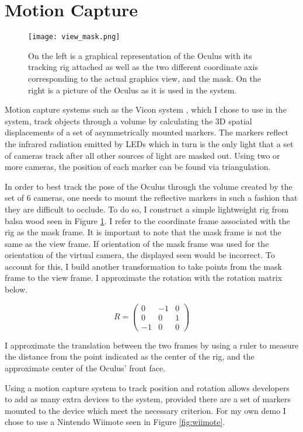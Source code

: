 \section{Motion Capture}
\label{sec:mocap}

\begin{figure}[]
\centering
\texttt{[image: view\_mask.png]}
\caption{On the left is a graphical representation of the Oculus with its
tracking rig attached as well as the two different coordinate axis
corresponding to the actual graphics view, and the mask. On the right
is a picture of the Oculus as it is used in the system.}
\label{fig:mask}
\end{figure}

Motion capture systems such as the Vicon system \cite{website:vicon}, which I
chose to use in the system,  track objects through a volume by calculating the
3D spatial displacements of a set of asymmetrically mounted markers. The
markers reflect the infrared radiation emitted by LEDs which in turn is the
only light that a set of cameras track after all other sources of light are
masked out. Using two or more cameras, the position of each marker can be found
via triangulation.

In order to best track the pose of the Oculus through the volume created by the
set of 6 cameras, one needs to mount the reflective markers in such a fashion
that they are difficult to occlude. To do so, I construct a simple lightweight
rig from balsa wood seen in Figure \ref{fig:mask}. I refer to the coordinate
frame associated with the rig as the mask frame. It is important to note that
the mask frame is not the same as the view frame. If orientation of the mask
frame was used for the orientation of the virtual camera, the displayed seen
would be incorrect. To account for this, I build another transformation to
take points from the mask frame to the view frame. I approximate the rotation
with the rotation matrix below.

\[
R = \begin{pmatrix} 0 & -1 & 0 \\ 0 & 0 & 1 \\ -1 & 0 & 0 \end{pmatrix}
\]

I approximate the translation between the two frames by using a ruler to
measure the distance from the point indicated as the center of the rig, and the
approximate center of the Oculus' front face.

Using a motion capture system to track position and rotation allows developers
to add as many extra devices to the system, provided there are a set of markers
mounted to the device which meet the necessary criterion. For my own demo I
chose to use a Nintendo Wiimote seen in Figure \ref{fig:wiimote}.

